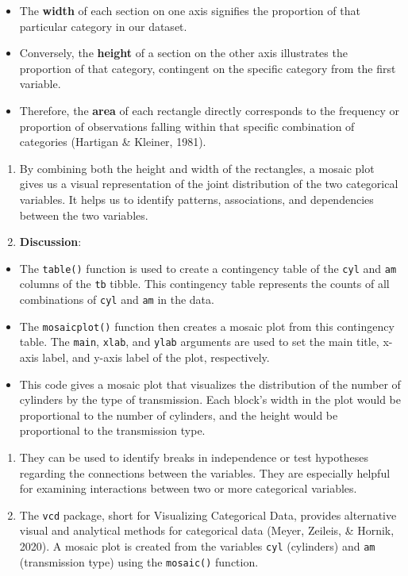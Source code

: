 \documentclass[
  letterpaper,
  DIV=11,
  numbers=noendperiod]{scrreport}
\begin{document}
\begin{itemize}
\item
  The \textbf{width} of each section on one axis signifies the
  proportion of that particular category in our dataset.
\item
  Conversely, the \textbf{height} of a section on the other axis
  illustrates the proportion of that category, contingent on the
  specific category from the first variable.
\item
  Therefore, the \textbf{area} of each rectangle directly corresponds to
  the frequency or proportion of observations falling within that
  specific combination of categories (Hartigan \& Kleiner, 1981).
\end{itemize}

\begin{enumerate}
\def\labelenumi{\arabic{enumi}.}
\setcounter{enumi}{2}
\item
  By combining both the height and width of the rectangles, a mosaic
  plot gives us a visual representation of the joint distribution of the
  two categorical variables. It helps us to identify patterns,
  associations, and dependencies between the two variables.
\item
  \textbf{Discussion}:
\end{enumerate}

\begin{itemize}
\item
  The \texttt{table()} function is used to create a contingency table of
  the \texttt{cyl} and \texttt{am} columns of the \texttt{tb} tibble.
  This contingency table represents the counts of all combinations of
  \texttt{cyl} and \texttt{am} in the data.
\item
  The \texttt{mosaicplot()} function then creates a mosaic plot from
  this contingency table. The \texttt{main}, \texttt{xlab}, and
  \texttt{ylab} arguments are used to set the main title, x-axis label,
  and y-axis label of the plot, respectively.
\item
  This code gives a mosaic plot that visualizes the distribution of the
  number of cylinders by the type of transmission. Each block's width in
  the plot would be proportional to the number of cylinders, and the
  height would be proportional to the transmission type.
\end{itemize}

\begin{enumerate}
\def\labelenumi{\arabic{enumi}.}
\setcounter{enumi}{4}
\item
  They can be used to identify breaks in independence or test hypotheses
  regarding the connections between the variables. They are especially
  helpful for examining interactions between two or more categorical
  variables.
\item
  The \texttt{vcd} package, short for Visualizing Categorical Data,
  provides alternative visual and analytical methods for categorical
  data (Meyer, Zeileis, \& Hornik, 2020). A mosaic plot is created from
  the variables \texttt{cyl} (cylinders) and \texttt{am} (transmission
  type) using the \texttt{mosaic()} function.
\end{enumerate}
\end{document}
